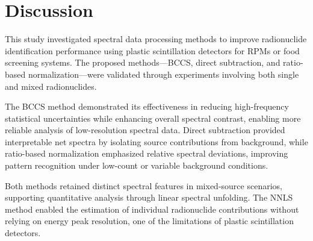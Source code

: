 \documentclass[10pt]{wlscirep}
\begin{document}

\section*{Discussion}

This study investigated spectral data processing methods to improve radionuclide identification performance using plastic scintillation detectors for RPMs or food screening systems. The proposed methods—BCCS, direct subtraction, and ratio-based normalization—were validated through experiments involving both single and mixed radionuclides.

The BCCS method demonstrated its effectiveness in reducing high-frequency statistical uncertainties while enhancing overall spectral contrast, enabling more reliable analysis of low-resolution spectral data. Direct subtraction provided interpretable net spectra by isolating source contributions from background, while ratio-based normalization emphasized relative spectral deviations, improving pattern recognition under low-count or variable background conditions.

Both methods retained distinct spectral features in mixed-source scenarios, supporting quantitative analysis through linear spectral unfolding. The NNLS method enabled the estimation of individual radionuclide contributions without relying on energy peak resolution, one of the limitations of plastic scintillation detectors.
\end{document}
